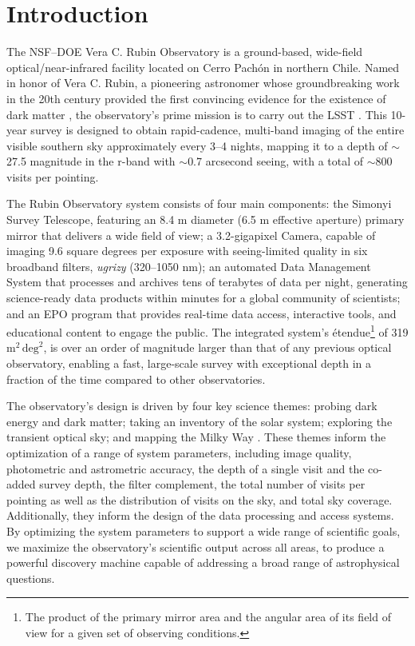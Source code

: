 \section{Introduction
\label{sec:intro}}
The \gls{NSF}–\gls{DOE} Vera C. Rubin Observatory is a ground-based, wide-field optical/near-infrared facility located on Cerro Pach\'on in northern Chile.
Named in honor of Vera C. Rubin, a pioneering astronomer whose groundbreaking work in the 20th century provided the first convincing evidence for the existence of dark matter \citep{1970ApJ...159..379R, 1980ApJ...238..471R}, the observatory’s prime mission is to carry out the \gls{LSST} \citep{2019ApJ...873..111I}.
This 10-year survey is designed to obtain rapid-\gls{cadence}, multi-band imaging of the entire visible southern sky approximately every 3–4 nights, mapping it to a depth of $\sim$ 27.5 magnitude in the r-band with $\sim$0.7 arcsecond \gls{seeing}, with a total of $\sim$800 visits per pointing.

The Rubin Observatory system consists of four main components: the \gls{Simonyi Survey Telescope}, featuring an 8.4 m diameter (6.5 m effective aperture) primary mirror that delivers a wide field of view; a 3.2-gigapixel Camera, capable of imaging 9.6 square degrees per exposure with seeing-limited quality in six broadband filters, \textit{ugrizy} (320–1050 nm); an automated \gls{Data Management System} that processes and archives tens of terabytes of data per night, generating science-ready data products within minutes for a global community of scientists; and an \gls{EPO} program that provides real-time data access, interactive tools, and educational content to engage the public.
The integrated system's \'etendue\footnote{The product of the primary mirror area and the angular area of its field of view for a given set of observing conditions.} of 319 $\text{m}^2 \,\text{deg}^2$, is over an order of magnitude larger than that of any  previous optical observatory, enabling a fast, large-scale survey with exceptional depth in a fraction of the time compared to other observatories.

The observatory's design is driven by four key science themes: probing dark energy and dark matter; taking an inventory of the solar system; exploring the \gls{transient} optical sky; and mapping the Milky Way \citep{2019ApJ...873..111I}.
These themes inform the optimization of a range of system parameters, including image quality, photometric and astrometric accuracy, the depth of a single visit and the co-added survey depth, the filter complement, the total number of visits per pointing as well as the distribution of visits on the sky, and  total sky coverage.
Additionally, they inform the design of the data processing and access systems.
By optimizing the system parameters to support a wide range of scientific goals, we maximize the observatory's scientific output across all areas, to produce a powerful discovery machine capable of addressing a broad range of astrophysical questions.

